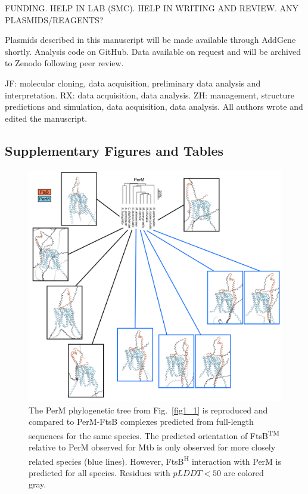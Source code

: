 \documentclass[pdflatex,sn-basic]{sn-jnl}%
\newcommand\mtb{Mtb}
\newcommand\ftsbTM{FtsB\textsuperscript{TM}}
\newcommand\ftsbH{FtsB\textsuperscript{H}}
\begin{document}
\loremipsum{}

\backmatter


FUNDING. HELP IN LAB (SMC). HELP IN WRITING AND REVIEW. ANY PLASMIDS/REAGENTS?

Plasmids described in this manuscript will be made available through AddGene shortly.
Analysis code on GitHub.
Data available on request and will be archived to Zenodo following peer review.


JF: molecular cloning, data acquisition, preliminary data analysis and interpretation. RX: data acquisition, data analysis. ZH: management, structure predictions and simulation, data acquisition, data analysis. All authors wrote and edited the manuscript.


\begin{appendices}

\section{Supplementary Figures and Tables}

\begin{figure}[h]
\centering
\includegraphics[width=1.0\textwidth]{../figures/figS1.png}
\caption{The PerM phylogenetic tree from Fig.~\ref{fig1_1} is reproduced and compared to PerM-FtsB complexes predicted from full-length sequences for the same species. The predicted orientation of \ftsbTM{} relative to PerM observed for \mtb{} is only observed for more closely related species (blue lines). However, \ftsbH{} interaction with PerM is predicted for all species. Residues with $pLDDT<50$ are colored gray.}\label{figS1}
\end{figure}

\end{appendices}
\end{document}
